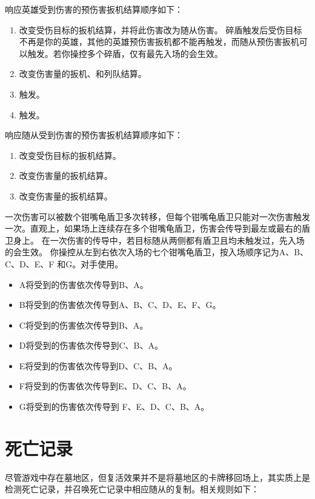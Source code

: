 响应英雄受到伤害的预伤害扳机结算顺序如下：
\begin{enumerate}
    \item 改变受伤目标的扳机结算，并将此伤害改为随从伤害。
        \notice 碎盾触发后受伤目标不再是你的英雄，其他的英雄预伤害扳机都不能再触发，而随从预伤害扳机可以触发。若你操控多个碎盾，仅有最先入场的会生效。
    \item 改变伤害量的扳机、和列队结算。
    \item {}触发。
    \item {}触发。
\end{enumerate}

响应随从受到伤害的预伤害扳机结算顺序如下：
\begin{enumerate}
    \item 改变受伤目标的扳机结算。
    \item 改变伤害量的扳机结算。
    \item 改变伤害量的扳机结算。
\end{enumerate}

一次伤害可以被数个钳嘴龟盾卫多次转移，但每个钳嘴龟盾卫只能对一次伤害触发一次。直观上，如果场上连续存在多个钳嘴龟盾卫，伤害会传导到最左或最右的盾卫身上。
\notice 在一次伤害的传导中，若目标随从两侧都有盾卫且均未触发过，先入场的会生效。
\example 你操控从左到右依次入场的七个钳嘴龟盾卫，按入场顺序记为A、B、C、D、E、F 和G。对手使用。
\begin{itemize}
    \item A将受到的伤害依次传导到B、A。
    \item B将受到的伤害依次传导到A、B、C、D、E、F、G。
    \item C将受到的伤害依次传导到B、A。
    \item D将受到的伤害依次传导到C、B、A。
    \item E将受到的伤害依次传导到D、C、B、A。
    \item F将受到的伤害依次传导到E、D、C、B、A。
    \item G将受到的伤害依次传导到 F、E、D、C、B、A。
\end{itemize}

\section{死亡记录}

尽管游戏中存在墓地区，但复活效果并不是将墓地区的卡牌移回场上，其实质上是检测死亡记录，并召唤死亡记录中相应随从的复制。相关规则如下：

